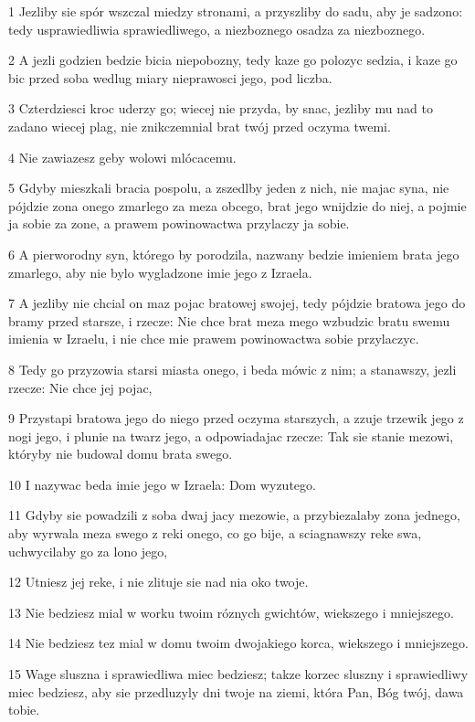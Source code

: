 \par 1 Jezliby sie spór wszczal miedzy stronami, a przyszliby do sadu, aby je sadzono: tedy usprawiedliwia sprawiedliwego, a niezboznego osadza za niezboznego.
\par 2 A jezli godzien bedzie bicia niepobozny, tedy kaze go polozyc sedzia, i kaze go bic przed soba wedlug miary nieprawosci jego, pod liczba.
\par 3 Czterdziesci kroc uderzy go; wiecej nie przyda, by snac, jezliby mu nad to zadano wiecej plag, nie znikczemnial brat twój przed oczyma twemi.
\par 4 Nie zawiazesz geby wolowi mlócacemu.
\par 5 Gdyby mieszkali bracia pospolu, a zszedlby jeden z nich, nie majac syna, nie pójdzie zona onego zmarlego za meza obcego, brat jego wnijdzie do niej, a pojmie ja sobie za zone, a prawem powinowactwa przylaczy ja sobie.
\par 6 A pierworodny syn, którego by porodzila, nazwany bedzie imieniem brata jego zmarlego, aby nie bylo wygladzone imie jego z Izraela.
\par 7 A jezliby nie chcial on maz pojac bratowej swojej, tedy pójdzie bratowa jego do bramy przed starsze, i rzecze: Nie chce brat meza mego wzbudzic bratu swemu imienia w Izraelu, i nie chce mie prawem powinowactwa sobie przylaczyc.
\par 8 Tedy go przyzowia starsi miasta onego, i beda mówic z nim; a stanawszy, jezli rzecze: Nie chce jej pojac,
\par 9 Przystapi bratowa jego do niego przed oczyma starszych, a zzuje trzewik jego z nogi jego, i plunie na twarz jego, a odpowiadajac rzecze: Tak sie stanie mezowi, któryby nie budowal domu brata swego.
\par 10 I nazywac beda imie jego w Izraela: Dom wyzutego.
\par 11 Gdyby sie powadzili z soba dwaj jacy mezowie, a przybiezalaby zona jednego, aby wyrwala meza swego z reki onego, co go bije, a sciagnawszy reke swa, uchwycilaby go za lono jego,
\par 12 Utniesz jej reke, i nie zlituje sie nad nia oko twoje.
\par 13 Nie bedziesz mial w worku twoim róznych gwichtów, wiekszego i mniejszego.
\par 14 Nie bedziesz tez mial w domu twoim dwojakiego korca, wiekszego i mniejszego.
\par 15 Wage sluszna i sprawiedliwa miec bedziesz; takze korzec sluszny i sprawiedliwy miec bedziesz, aby sie przedluzyly dni twoje na ziemi, która Pan, Bóg twój, dawa tobie.
